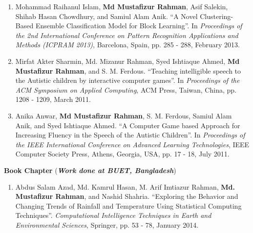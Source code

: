 \documentclass[11pt]{res}
\begin{document}
\begin{resume}
\begin{enumerate}


    \item Mohammad Raihanul Islam, {\bf Md Mustafizur Rahman}, Asif Salekin, Shihab Hasan Chowdhury, and Samiul Alam Anik. ``A
    Novel Clustering-Based Ensemble Classification Model for Block Learning''.
    In {\it Proceedings of the 2nd International Conference on Pattern
    Recognition Applications and Methods (ICPRAM 2013)}, Barcelona, Spain, pp. 285 - 288, February 2013.
    
    
    \item Mirfat Akter Sharmin, Md. Mizanur Rahman, Syed Ishtiaque Ahmed, {\bf Md Mustafizur Rahman}, and S. M. Ferdous. ``Teaching intelligible speech to the Autistic children by interactive computer games''. In {\it Proceedings of the ACM Symposium on Applied Computing}, ACM Press, Taiwan, China, pp. 1208 - 1209, March 2011. %
    
    \item Anika Anwar, {\bf Md Mustafizur Rahman}, S. M. Ferdous, Samiul Alam Anik, and Syed Ishtiaque Ahmed. ``A Computer Game based Approach for Increasing Fluency in the Speech of the Autistic Children''. In {\it Proceedings of the IEEE International Conference on Advanced Learning Technologies}, IEEE Computer Society Press, Athens, Georgia, USA, pp. 17 - 18, July 2011. %
\end{enumerate}   


{\large \bf Book Chapter} ({\sl \textbf{Work done at BUET, Bangladesh}})
\vspace{2pt}
\begin{enumerate} \itemsep -2pt
\item Abdus Salam Azad, Md. Kamrul Hasan, M. Arif Imtiazur Rahman, {\bf Md. Mustafizur Rahman}, and Nashid Shahria. ``Exploring the Behavior and Changing Trends of Rainfall and Temperature Using Statistical Computing Techniques''. {\it Computational Intelligence Techniques in Earth and Environmental Sciences}, Springer, pp. 53 - 78, January 2014. %
\end{enumerate}


\begin{comment} \itemsep -2pt 

 \item  Arshia Zernab Hassan, Bushra Tasnim Zahed, Fatema Tuz Zohora, Johra Muhammad Moosa, Tasmiha Salam, {\bf Md Mustafizur Rahman}, Hasan Shahid Ferdous, and Syed Ishtiaque Ahmed. ``Socializing Autistic Children with Interactive Computer Games''. In Proceedings of the IEEE Newsletter on Learning Technologies, Vol. 13, Issue 4, pp. 62 - 65, October 2011.
    

\end{comment}
\end{resume}
\end{document}
